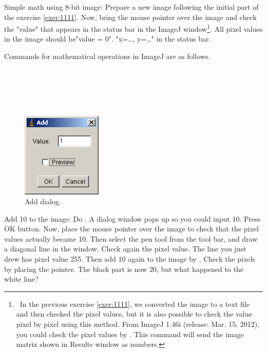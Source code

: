 \begin{indentexercise}{1}
Simple math using 8-bit image: Prepare a new
image following the initial part of the exercise \ref{exer:1111}. Now,
bring the mouse pointer over the image and check the
"value" that appears in the
status bar in the ImageJ window\footnote{\ In the previous exercise \ref{exer:1111}, 
we converted the image to a text file and then checked the pixel
values, but it is also possible to check the value pixel by pixel using
this method. From ImageJ 1.46i (release: Mar. 15, 2012), 
you could check the pixel values by . 
This command will send the image matrix shown in Results window as numbers.}. 
All pixel values in the image should be"value = 0".
"x=\ldots, y=\ldots " in the
status bar. 

Commands for mathematical operations in ImageJ are as follows. 

\\
\\ 
 \\
\\

\begin{figure}[htbp]
\begin{center}
\includegraphics[width=3.8cm]{img/CMCIBasicCourse201102-img12.png}
\caption{ Add dialog.}
\label{fig:img12}
\end{center}
\end{figure}


Add 10 to the image: Do . A dialog window pops up so you could
input 10. Press OK button. Now, place the mouse pointer over the image
to check that the pixel values actually became 10. Then select the pen
tool from the tool bar, and draw a diagonal line in the window. Check
again the pixel value. The line you just drew has pixel value 255. Then
add 10 again to the image by . Check the pixels by placing the pointer.
The black part is now 20, but what happened to the white line? 


\end{indentexercise}
